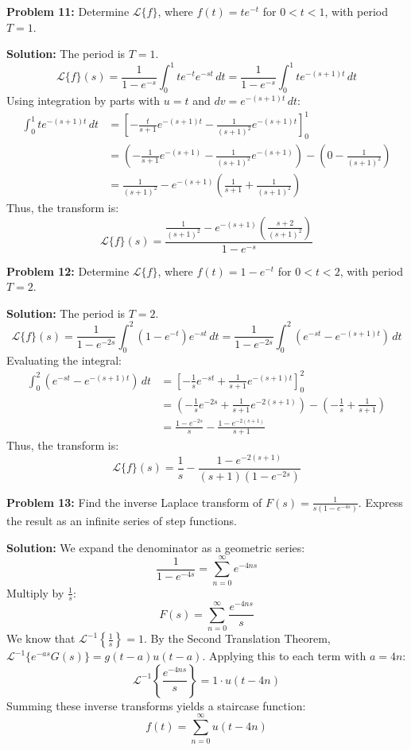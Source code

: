\documentclass[11pt, letterpaper]{article}
\theoremstyle{definition}
\theoremstyle{remark}
\begin{document}
\vspace{1em}
\textbf{Problem 11:} Determine $\mathcal{L}\{f\}$, where $f(t) = t e^{-t}$ for $0 < t < 1$, with period $T = 1$.

\textbf{Solution:}
The period is $T = 1$.
\[ \mathcal{L}\{f\}(s) = \frac{1}{1 - e^{-s}} \int_0^1 t e^{-t} e^{-st} \,dt = \frac{1}{1 - e^{-s}} \int_0^1 t e^{-(s+1)t} \,dt \]
Using integration by parts with $u = t$ and $dv = e^{-(s+1)t} \,dt$:
\begin{align*}
\int_0^1 t e^{-(s+1)t} \,dt &= \left[ -\frac{t}{s+1} e^{-(s+1)t} - \frac{1}{(s+1)^2} e^{-(s+1)t} \right]_0^1 \\
&= \left( -\frac{1}{s+1} e^{-(s+1)} - \frac{1}{(s+1)^2} e^{-(s+1)} \right) - \left( 0 - \frac{1}{(s+1)^2} \right) \\
&= \frac{1}{(s+1)^2} - e^{-(s+1)} \left( \frac{1}{s+1} + \frac{1}{(s+1)^2} \right)
\end{align*}
Thus, the transform is:
\[ \mathcal{L}\{f\}(s) = \frac{\frac{1}{(s+1)^2} - e^{-(s+1)} \left( \frac{s+2}{(s+1)^2} \right)}{1 - e^{-s}} \]

\vspace{1em}
\textbf{Problem 12:} Determine $\mathcal{L}\{f\}$, where $f(t) = 1 - e^{-t}$ for $0 < t < 2$, with period $T = 2$.

\textbf{Solution:}
The period is $T = 2$.
\[ \mathcal{L}\{f\}(s) = \frac{1}{1 - e^{-2s}} \int_0^2 (1 - e^{-t}) e^{-st} \,dt = \frac{1}{1 - e^{-2s}} \int_0^2 \left( e^{-st} - e^{-(s+1)t} \right) \,dt \]
Evaluating the integral:
\begin{align*}
\int_0^2 \left( e^{-st} - e^{-(s+1)t} \right) \,dt &= \left[ -\frac{1}{s} e^{-st} + \frac{1}{s+1} e^{-(s+1)t} \right]_0^2 \\
&= \left( -\frac{1}{s} e^{-2s} + \frac{1}{s+1} e^{-2(s+1)} \right) - \left( -\frac{1}{s} + \frac{1}{s+1} \right) \\
&= \frac{1 - e^{-2s}}{s} - \frac{1 - e^{-2(s+1)}}{s+1}
\end{align*}
Thus, the transform is:
\[ \mathcal{L}\{f\}(s) = \frac{1}{s} - \frac{1 - e^{-2(s+1)}}{(s+1)(1 - e^{-2s})} \]

\vspace{1em}
\textbf{Problem 13:} Find the inverse Laplace transform of $F(s) = \frac{1}{s(1 - e^{-4s})}$. Express the result as an infinite series of step functions.

\textbf{Solution:}
We expand the denominator as a geometric series:
\[ \frac{1}{1 - e^{-4s}} = \sum_{n=0}^\infty e^{-4ns} \]
Multiply by $\frac{1}{s}$:
\[ F(s) = \sum_{n=0}^\infty \frac{e^{-4ns}}{s} \]
We know that $\mathcal{L}^{-1} \left\{ \frac{1}{s} \right\} = 1$. By the Second Translation Theorem, $\mathcal{L}^{-1}\{e^{-as}G(s)\} = g(t - a)u(t - a)$. Applying this to each term with $a = 4n$:
\[ \mathcal{L}^{-1} \left\{ \frac{e^{-4ns}}{s} \right\} = 1 \cdot u(t - 4n) \]
Summing these inverse transforms yields a staircase function:
\[ f(t) = \sum_{n=0}^\infty u(t - 4n) \]
\end{document}
